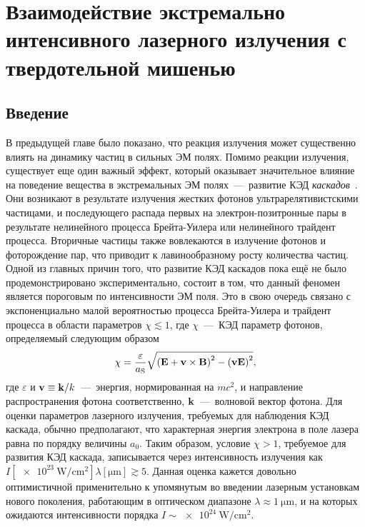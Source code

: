 \chapter{Взаимодействие экстремально интенсивного лазерного излучения с твердотельной мишенью}\label{ch:ch2}

\section{Введение}\label{sec:ch2/sec1}
В предыдущей главе было показано, что реакция излучения может существенно влиять на динамику частиц в сильных ЭМ полях.
Помимо реакции излучения, существует еще один важный эффект, который оказывает значительное влияние на поведение вещества в экстремальных ЭМ полях~---~развитие КЭД \textit{каскадов}~\cite{sturrock1971model,daugherty1982electromagnetic,nerush2007radiation,Bell2008,Nerush11a,Ridgers12,narozhny2015quantum,Kostyukov2016,nerush2017weibel,efimenko2019laser,yakimenko2019prospect}.
Они возникают в результате излучения жестких фотонов ультрарелятивистскими частицами, и последующего распада первых на электрон-позитронные пары в результате нелинейного процесса Брейта-Уилера или нелинейного трайдент процесса.
Вторичные частицы также вовлекаются в излучение фотонов и фоторождение пар, что приводит к лавинообразному росту количества частиц.
Одной из главных причин того, что развитие КЭД каскадов пока ещё не было продемонстрировано экспериментально, состоит в том, что данный феномен является пороговым по интенсивности ЭМ поля.
Это в свою очередь связано с экспоненциально малой вероятностью процесса Брейта-Уилера и трайдент процесса в области параметров $\chi\lesssim 1$, где $\chi$~---~КЭД параметр фотонов, определяемый следующим образом
\begin{equation}
    \chi = \frac{\varepsilon}{a_\mathrm{S}} \sqrt{{\left( \vb{E} + \vb{v}\times\vb{B} \right)}^2 - {\left(\vb{v}\vb{E} \right)}^2} ,
\end{equation}
где $\varepsilon$ и $\vb{v}\equiv\vb{k}/k$~---~энергия, нормированная на $mc^2$, и направление распространения фотона соответственно, $\vb{k}$~---~волновой вектор фотона.
Для оценки параметров лазерного излучения, требуемых для наблюдения КЭД каскада, обычно предполагают, что характерная энергия электрона в поле лазера равна по порядку величины $a_0$.
Таким образом, условие $\chi>1$, требуемое для развития КЭД каскада, записывается через интенсивность излучения как $I[\SI{e23}{\watt/\centi\meter^2}]\lambda[\si{\um}]\gtrsim 5$.
Данная оценка кажется довольно оптимистичной применительно к упомянутым во введении лазерным установкам нового поколения, работающим в оптическом диапазоне $\lambda\approx\SI{1}{\um}$, и на которых ожидаются интенсивности порядка ${I\sim\SI{e24}{\watt/\centi\meter^2}}$.

